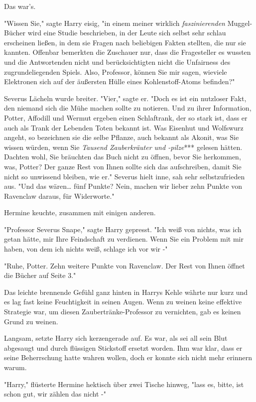 {Das war's.

"Wissen Sie," sagte Harry eisig, "in einem meiner wirklich \emph{faszinierenden} Muggel-Bücher wird eine Studie beschrieben, in der Leute sich selbst sehr schlau erscheinen ließen, in dem sie Fragen nach beliebigen Fakten stellten, die nur sie kannten. Offenbar bemerkten die Zuschauer nur, dass die Fragesteller es wussten und die Antwortenden nicht und berücksichtigten nicht die Unfairness des zugrundeliegenden Spiels. Also, Professor, können Sie mir sagen, wieviele Elektronen sich auf der äußersten Hülle eines Kohlenstoff-Atoms befinden?"

Severus Lächeln wurde breiter. "Vier," sagte er. "Doch es ist ein nutzloser Fakt, den niemand sich die Mühe machen sollte zu notieren. Und zu ihrer Information, Potter, Affodill und Wermut ergeben einen Schlaftrank, der so stark ist, dass er auch als Trank der Lebenden Toten bekannt ist. Was Eisenhut und Wolfswurz angeht, so bezeichnen sie die selbe Pflanze, auch bekannt als Akonit, was Sie wissen würden, wenn Sie \emph{Tausend Zauberkräuter und -pilze}*** gelesen hätten. Dachten wohl, Sie bräuchten das Buch nicht zu öffnen, bevor Sie herkommen, was, Potter? Der ganze Rest von Ihnen sollte sich das aufschreiben, damit Sie nicht so unwissend bleiben, wie er." Severus hielt inne, sah sehr selbstzufrieden aus. "Und das wären… fünf Punkte? Nein, machen wir lieber zehn Punkte von Ravenclaw daraus, für Widerworte."

Hermine keuchte, zusammen mit einigen anderen.

"Professor Severus Snape," sagte Harry gepresst. "Ich weiß von nichts, was ich getan hätte, mir Ihre Feindschaft zu verdienen. Wenn Sie ein Problem mit mir haben, von dem ich nichts weiß, schlage ich vor wir -"

"Ruhe, Potter. Zehn weitere Punkte von Ravenclaw. Der Rest von Ihnen öffnet die Bücher auf Seite 3."

Das leichte brennende Gefühl ganz hinten in Harrys Kehle währte nur kurz und es lag fast keine Feuchtigkeit in seinen Augen. Wenn zu weinen keine effektive Strategie war, um diesen Zaubertränke-Professor zu vernichten, gab es keinen Grund zu weinen.

Langsam, setzte Harry sich kerzengerade auf. Es war, als sei all sein Blut abgesaugt und durch flüssigen Stickstoff ersetzt worden. Ihm war klar, dass er seine Beherrschung hatte wahren wollen, doch er konnte sich nicht mehr erinnern warum.

"Harry," flüsterte Hermine hektisch über zwei Tische hinweg, "lass es, bitte, ist schon gut, wir zählen das nicht -"

}
